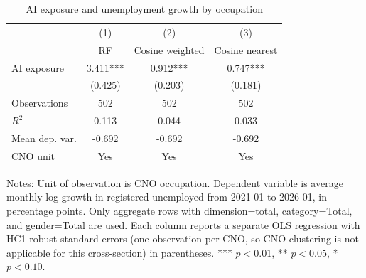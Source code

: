 \begin{table}[!htbp]\centering
\caption{AI exposure and unemployment growth by occupation}
\label{tab:ai_exposure_unemployment_growth}
\begin{tabular}{lccc}
\toprule
 & (1) & (2) & (3) \\
 & RF & Cosine weighted & Cosine nearest \\
\midrule
AI exposure & 3.411*** & 0.912*** & 0.747*** \\
 & (0.425) & (0.203) & (0.181) \\
\midrule
Observations & 502 & 502 & 502 \\
$R^2$ & 0.113 & 0.044 & 0.033 \\
Mean dep. var. & -0.692 & -0.692 & -0.692 \\
CNO unit & Yes & Yes & Yes \\
\bottomrule
\end{tabular}
\vspace{0.25em}
\begin{minipage}{0.96\linewidth}
Notes: Unit of observation is CNO occupation. Dependent variable is average monthly log growth in registered unemployed from 2021-01 to 2026-01, in percentage points. Only aggregate rows with dimension=total, category=Total, and gender=Total are used. Each column reports a separate OLS regression with HC1 robust standard errors (one observation per CNO, so CNO clustering is not applicable for this cross-section) in parentheses. *** $p<0.01$, ** $p<0.05$, * $p<0.10$.
\end{minipage}
\end{table}
